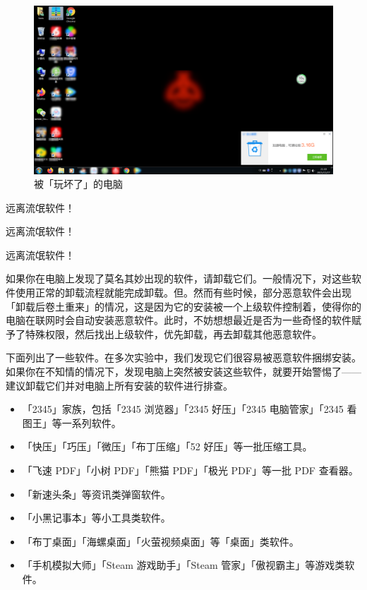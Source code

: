 \begin{figure}[htb!]
  \centering
  \includegraphics[width=12cm]{assets/basic/Computer_with_unwanted_software.png}
  \caption{被「玩坏了」的电脑}
  \label{fig:Computer_with_unwanted_software2}
\end{figure}

\begin{danger}
  \centering
  远离流氓软件！\par
  \large 远离流氓软件！\par
  \LARGE 远离流氓软件！\par
\end{danger}

如果你在电脑上发现了莫名其妙出现的软件，请卸载它们。一般情况下，对这些软件使用正常的卸载流程就能完成卸载。但。然而有些时候，部分恶意软件会出现「卸载后卷土重来」的情况，这是因为它的安装被一个上级软件控制着，使得你的电脑在联网时会自动安装恶意软件。此时，不妨想想最近是否为一些奇怪的软件赋予了特殊权限，然后找出上级软件，优先卸载，再去卸载其他恶意软件。

下面列出了一些软件。在多次实验中，我们发现它们很容易被恶意软件捆绑安装。如果你在不知情的情况下，发现电脑上突然被安装这些软件，就要开始警惕了——建议卸载它们并对电脑上所有安装的软件进行排查。

\begin{itemize}
  \item 「2345」家族，包括「2345 浏览器」「2345 好压」「2345 电脑管家」「2345 看图王」等一系列软件。
  \item 「快压」「巧压」「微压」「布丁压缩」「52 好压」等一批压缩工具。
  \item 「飞速 PDF」「小树 PDF」「熊猫 PDF」「极光 PDF」等一批 PDF 查看器。
  \item 「新速头条」等资讯类弹窗软件。
  \item 「小黑记事本」等小工具类软件。
  \item 「布丁桌面」「海螺桌面」「火萤视频桌面」等「桌面」类软件。
  \item 「手机模拟大师」「Steam 游戏助手」「Steam 管家」「傲视霸主」等游戏类软件。
\end{itemize}


